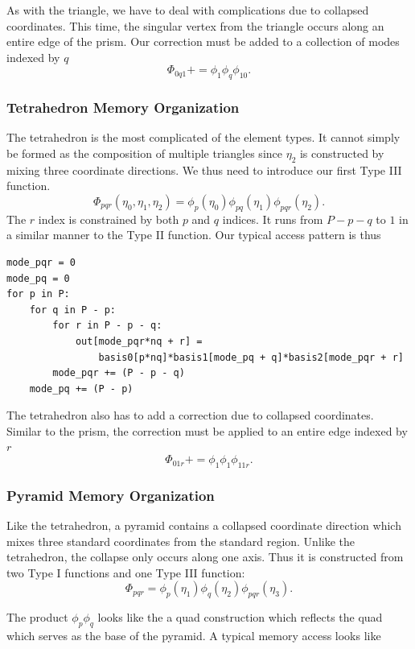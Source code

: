 As with the triangle, we have to deal with complications due to collapsed coordinates. This time, the singular vertex from the triangle occurs along an entire edge of the prism. Our correction must be added to a collection of modes indexed by $q$
\[
    \Phi_{0q1} += \phi_1 \phi_q \phi_{10}.
\]

\subsubsection{Tetrahedron Memory Organization}
The tetrahedron is the most complicated of the element types. It cannot simply be formed as the composition of multiple triangles since $\eta_2$ is constructed by mixing three coordinate directions. We thus need to introduce our first Type III function.
\[
    \Phi_{pqr}(\eta_0, \eta_1, \eta_2) = \phi_{p}(\eta_0) \phi_{pq} (\eta_1) \phi_{pqr}(\eta_2).
\]
The $r$ index is constrained by both $p$ and $q$ indices. It runs from $P - p - q$ to $1$ in a similar manner to the Type II function. Our typical access pattern is thus \\
\begin{lstlisting}
mode_pqr = 0
mode_pq = 0
for p in P:
    for q in P - p:
        for r in P - p - q:
            out[mode_pqr*nq + r] = 
                basis0[p*nq]*basis1[mode_pq + q]*basis2[mode_pqr + r]
        mode_pqr += (P - p - q)
    mode_pq += (P - p)
\end{lstlisting}

The tetrahedron also has to add a correction due to collapsed coordinates. Similar to the prism, the correction must be applied to an entire edge indexed by $r$
\[
    \Phi_{01r} += \phi_1 \phi_1 \phi_{11r}.
\]

\subsubsection{Pyramid Memory Organization}

Like the tetrahedron, a pyramid contains a collapsed coordinate direction which mixes three standard coordinates from the standard region. Unlike the tetrahedron, the collapse only occurs along one axis. Thus it is constructed from two Type I functions and one Type III function: \\
\[
    \Phi_{pqr} = \phi_p(\eta_1) \phi_q(\eta_2) \phi_{pqr}(\eta_3).
\]

The product $\phi_p \phi_q$ looks like the a quad construction which reflects the quad which serves as the base of the pyramid. A typical memory access looks like \\

